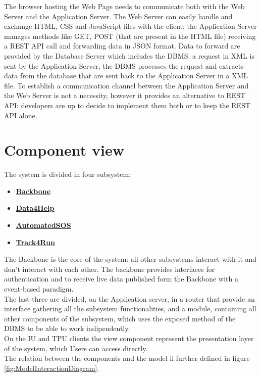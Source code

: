 The browser hosting the Web Page needs to communicate both with the Web Server and the Application Server. 
The Web Server can easily handle and exchange HTML, CSS and JavaScript files with the client; the Application Server manages methods like GET, POST  (that are present in the HTML file) receiving a REST API call and forwarding data in JSON format. Data to forward are provided by the Database Server which includes the DBMS: a request in XML is sent by the Application Server, the DBMS processes the request and extracts data from the database that are sent back to the Application Server in a XML file. To establish a communication channel between the Application Server and the Web Server is not a necessity, however it provides an alternative to REST API: developers are up to decide to implement them both or to keep the REST API alone. 

\section{Component view}
The system is divided in four subsystem:
\begin{itemize}
\item \textbf{\href{subsect:backboneComponentView}{Backbone}}
\item \textbf{\href{subsect:D4HComponentView}{Data4Help}}
\item \textbf{\href{subsect:ASOSComponentView}{AutomatedSOS}}
\item \textbf{\href{subsect:T4RComponentView}{Track4Run}}
\end{itemize}
The Backbone is the core of the system: all other subsystems interact with it and don't interact with each other. The backbone provides interfaces for authentication and to receive live data published form the Backbone with a event-based paradigm.\\
The last three are divided, on the Application server, in a router that provide an interface gathering all the subsystem functionalities, and a module, containing all other components of the subsystem, which uses the exposed method of the DBMS to be able to work indipendently. \\
On the IU and TPU clients the view component represent the presentation layer of the system, which Users can access directly.\\
The relation between the components and the model il further defined in figure \ref{fig:ModelInteractionDiagram}.
